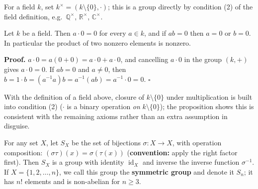 \documentclass[11pt]{report}
\renewenvironment{proof}[1][Proof]{\noindent\textbf{#1.} }{\hfill$\square$\par\vspace{5pt}}
\begin{document}
\begin{defbox}\label{def:multiplicative-group-field-k-x}
For a field $k$, set $k^\times = (k \setminus \{0\}, \cdot)$; this is a group directly by condition (2) of the field definition, e.g.\ $\mathbb{Q}^\times$, $\mathbb{R}^\times$, $\mathbb{C}^\times$.
\end{defbox}

\begin{propbox}\label{prop:no-zero-divisors-field}
Let $k$ be a field. Then $a \cdot 0 = 0$ for every $a \in k$, and if $ab = 0$ then $a = 0$ or $b = 0$. In particular the product of two nonzero elements is nonzero.
\end{propbox}

\begin{proof}
$a \cdot 0 = a(0 + 0) = a \cdot 0 + a \cdot 0$, and cancelling $a \cdot 0$ in the group $(k, +)$ gives $a \cdot 0 = 0$. If $ab = 0$ and $a \neq 0$, then $b = 1 \cdot b = (a^{-1}a)b = a^{-1}(ab) = a^{-1} \cdot 0 = 0$.
\end{proof}

\begin{rembox}\label{rem:consistency-field-axioms}
With the definition of a field above, closure of $k \setminus \{0\}$ under multiplication is built into condition (2) ($\cdot$ is a binary operation \emph{on} $k \setminus \{0\}$); the proposition shows this is consistent with the remaining axioms rather than an extra assumption in disguise.
\end{rembox}

\begin{defbox}\label{def:symmetric-groups-sx-sn}
For any set $X$, let $S_X$ be the set of bijections $\sigma: X \to X$, with operation composition: $(\sigma \tau)(x) = \sigma(\tau(x))$ (\textbf{convention:} apply the right factor first). Then $S_X$ is a group with identity $\operatorname{id}_X$ and inverse the inverse function $\sigma^{-1}$. If $X = \{1, 2, \ldots, n\}$, we call this group the \textbf{symmetric group} and denote it $S_n$; it has $n!$ elements and is non-abelian for $n \geq 3$.
\end{defbox}
\end{document}
